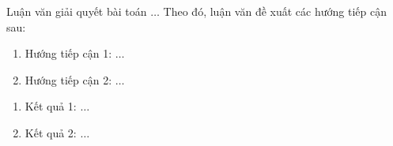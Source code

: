 \begin{trangthongtinluanvan}
    \begin{tomtatvi}
        Luận văn giải quyết bài toán $\ldots$ Theo đó, luận văn đề xuất các hướng tiếp cận sau:

        \begin{enumerate}
            \item Hướng tiếp cận 1: $\ldots$
            \item Hướng tiếp cận 2: $\ldots$
        \end{enumerate}
    \end{tomtatvi}

    \begin{ketquamoivi}
        \begin{enumerate}
            \item Kết quả 1: $\ldots$
            \item Kết quả 2: $\ldots$
        \end{enumerate}
    \end{ketquamoivi}

    \begin{ungdungvi}
    \end{ungdungvi}
\end{trangthongtinluanvan}

\begin{trangthesisinformation}
    \begin{summaryen}
    \end{summaryen}

    \begin{noveltyen}
    \end{noveltyen}

    \begin{applicationsen}
    \end{applicationsen}
\end{trangthesisinformation}
